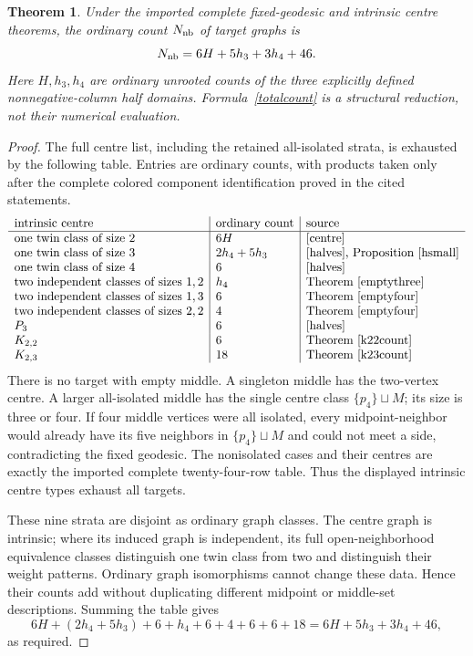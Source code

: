 \documentclass[11pt]{article}
\newtheorem{theorem}{Theorem}
\newcommand{\sq}{\sqcup}
\begin{document}
\begin{theorem}\label{total}
Under the imported complete fixed-geodesic and intrinsic centre theorems,
the ordinary count $N_{\rm nb}$ of target graphs is
\begin{equation}\label{totalcount}
 N_{\rm nb}=6H+5h_3+3h_4+46.
\end{equation}
Here $H,h_3,h_4$ are ordinary unrooted counts of the three explicitly
defined nonnegative-column half domains. Formula~\eqref{totalcount}
is a structural reduction, not their numerical evaluation.
\end{theorem}
\begin{proof}
The full centre list, including the retained all-isolated strata, is
exhausted by the following table. Entries are ordinary counts, with
products taken only after the complete colored component identification
proved in the cited statements.
\[
\begin{array}{l|l|l}
 \text{intrinsic centre}&\text{ordinary count}&\text{source}\\\hline
 \text{one twin class of size }2&6H&\text{\cite{centre}}\\
 \text{one twin class of size }3&2h_4+5h_3&\text{\cite{halves}, Proposition~\ref{hsmall}}\\
 \text{one twin class of size }4&6&\text{\cite{halves}}\\
 \text{two independent classes of sizes }1,2&h_4&\text{Theorem~\ref{emptythree}}\\
 \text{two independent classes of sizes }1,3&6&\text{Theorem~\ref{emptyfour}}\\
 \text{two independent classes of sizes }2,2&4&\text{Theorem~\ref{emptyfour}}\\
 P_3&6&\text{\cite{halves}}\\
 K_{2,2}&6&\text{Theorem~\ref{k22count}}\\
 K_{2,3}&18&\text{Theorem~\ref{k23count}}
\end{array}
\]
There is no target with empty middle. A singleton middle has the
two-vertex centre. A larger all-isolated middle has the single centre
class $\{p_4\}\sq M$; its size is three or four. If four middle
vertices were all isolated, every midpoint-neighbor would already have
its five neighbors in $\{p_4\}\sq M$ and could not meet a side,
contradicting the fixed geodesic. The nonisolated cases and their centres
are exactly the imported complete twenty-four-row table. Thus the
displayed intrinsic centre types exhaust all targets.

These nine strata are disjoint as ordinary graph classes. The centre
graph is intrinsic; where its induced graph is independent, its full
open-neighborhood equivalence classes distinguish one twin class from
two and distinguish their weight patterns. Ordinary graph isomorphisms
cannot change these data. Hence their counts add without duplicating
different midpoint or middle-set descriptions. Summing the table gives
\[
 6H+(2h_4+5h_3)+6+h_4+6+4+6+6+18
 =6H+5h_3+3h_4+46,
\]
as required.
\end{proof}
\end{document}
